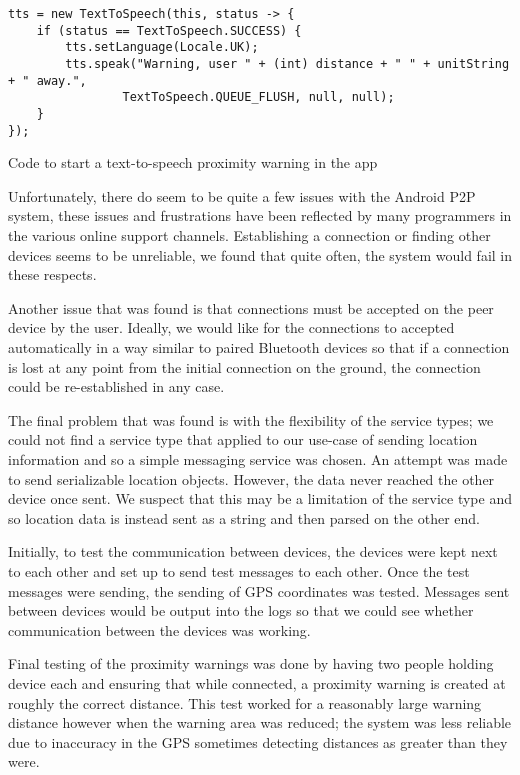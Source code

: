 \begin{listing}
  \centering
  \begin{verbatim}
tts = new TextToSpeech(this, status -> {
    if (status == TextToSpeech.SUCCESS) {
        tts.setLanguage(Locale.UK);
        tts.speak("Warning, user " + (int) distance + " " + unitString + " away.",
                TextToSpeech.QUEUE_FLUSH, null, null);
    }
});
  \end{verbatim}
  \caption{Code to start a text-to-speech proximity warning in the app}\label{lst:tts}
\end{listing}

Unfortunately, there do seem to be quite a few issues with the Android P2P system, these issues and frustrations have been reflected by many programmers in the various online support channels. Establishing a connection or finding other devices seems to be unreliable, we found that quite often, the system would fail in these respects.

Another issue that was found is that connections must be accepted on the peer device by the user. Ideally, we would like for the connections to accepted automatically in a way similar to paired Bluetooth devices so that if a connection is lost at any point from the initial connection on the ground, the connection could be re-established in any case.

The final problem that was found is with the flexibility of the service types; we could not find a service type that applied to our use-case of sending location information and so a simple messaging service was chosen. An attempt was made to send serializable location objects. However, the data never reached the other device once sent. We suspect that this may be a limitation of the service type and so location data is instead sent as a string and then parsed on the other end.

Initially, to test the communication between devices, the devices were kept next to each other and set up to send test messages to each other. Once the test messages were sending, the sending of GPS coordinates was tested. Messages sent between devices would be output into the logs so that we could see whether communication between the devices was working.

Final testing of the proximity warnings was done by having two people holding device each and ensuring that while connected, a proximity warning is created at roughly the correct distance. This test worked for a reasonably large warning distance however when the warning area was reduced; the system was less reliable due to inaccuracy in the GPS sometimes detecting distances as greater than they were.

